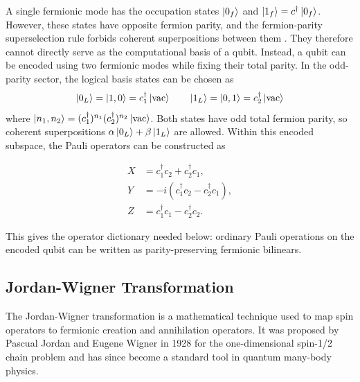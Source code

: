 A single fermionic mode has the occupation states
$\ket{0_f}$ and $\ket{1_f}=c^\dagger\ket{0_f}$.
However, these states have opposite fermion parity, and the fermion-parity
superselection rule forbids coherent superpositions between them \cite{bartlettReferenceFramesSuperselection2007}. They
therefore cannot directly serve as the computational basis of a qubit.
Instead, a qubit can be encoded using two fermionic modes while fixing their
total parity. In the odd-parity sector, the logical basis states can be chosen as
\[
\ket{0_L}=\ket{1,0}=c_1^\dagger\ket{\mathrm{vac}} 
\qquad
\ket{1_L}=\ket{0,1}=c_2^\dagger\ket{\mathrm{vac}}
\]
where $\ket{n_1,n_2}=(c_1^\dagger)^{n_1}
(c_2^\dagger)^{n_2}\ket{\mathrm{vac}}$.
Both states have odd total fermion parity, so coherent superpositions
$\alpha\ket{0_L}+\beta\ket{1_L}$ are allowed. Within this encoded subspace,
the Pauli operators can be constructed as

\begin{equation}
\begin{aligned}X &= c_1 ^{†} c_2 + c_2 ^{†} c_1, \\
Y &= -i(c_1 ^{†} c_2 - c_2 ^{†} c_1), \\
Z &= c_1 ^{†} c_1 - c_2 ^{†} c_2.
\end{aligned}
\label{eq:pauli_gates_in_fermionic_modes}
\end{equation}

This gives the operator dictionary needed below: ordinary Pauli operations on the encoded qubit can be written as parity-preserving fermionic bilinears.\\

\subsection{Jordan-Wigner Transformation\newline}
\label{sec:theory-jordan-wigner}
The Jordan-Wigner transformation is a mathematical technique used to map spin operators to fermionic creation and annihilation operators. It was proposed by Pascual Jordan and Eugene Wigner in 1928 \cite{jordanBerPaulischeQuivalenzverbot1928} for the one-dimensional spin-1/2 chain problem and has since become a standard tool in quantum many-body physics.\\

